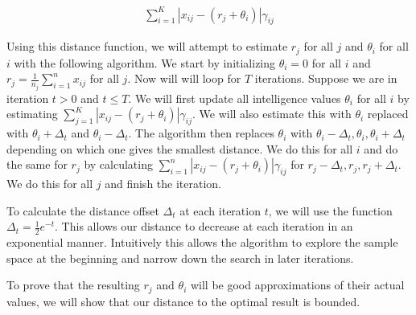 \documentclass[psamsfonts]{amsart}
\begin{document}
\begin{eqnarray}
\sum_{i=1}^K | x_{ij} - (r_j + \theta_i)| \gamma_{ij}
\end{eqnarray}

Using this distance function, we will attempt to estimate $r_j$ for all $j$ and $\theta_i$ for all $i$ with the following algorithm. We start by initializing $\theta_i = 0$ for all $i$ and $r_j = \frac{1}{n_j} \sum_{i=1}^n x_{ij}$ for all $j$. Now will will loop for $T$ iterations. Suppose we are in iteration $t > 0$ and $t \leq T$. We will first update all intelligence values $\theta_i$ for all $i$ by estimating $\sum_{j=1}^K |x_{ij} - (r_j + \theta_i)| \gamma_{ij}$. We will also estimate this with $\theta_i$ replaced with $\theta_i + \Delta_t$ and $\theta_i - \Delta_t$. The algorithm then replaces $\theta_i$ with $\theta_i - \Delta_t, \theta_i, \theta_i + \Delta_t$ depending on which one gives the smallest distance. We do this for all $i$ and do the same for $r_j$ by calculating $\sum_{i=1}^n |x_{ij} - (r_j + \theta_i)| \gamma_{ij}$ for $r_j - \Delta_t, r_j, r_j + \Delta_t$. We do this for all $j$ and finish the iteration.

To calculate the distance offset $\Delta_t$ at each iteration $t$, we will use the function $\Delta_t = \frac{1}{2} e^{-t}$. This allows our distance to decrease at each iteration in an exponential manner. Intuitively this allows the algorithm to explore the sample space at the beginning and narrow down the search in later iterations.

To prove that the resulting $r_j$ and $\theta_i$ will be good approximations of their actual values, we will show that our distance to the optimal result is bounded.
\end{document}
